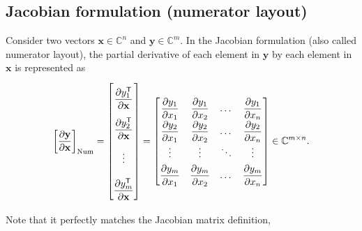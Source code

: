 \documentclass{article}
\newcommand{\trans}{\mathsf{T}}
\begin{document}
\subsection{Jacobian formulation (numerator layout)}

Consider two vectors \(\mathbf{x} \in \mathbb{C}^n\) and \(\mathbf{y} \in \mathbb{C}^m\). In the Jacobian formulation (also called numerator layout), the partial derivative of each element in \(\mathbf{y}\) by each element in \(\mathbf{x}\) is represented as
\begin{align}
    \label{eq:jacobian-formulation}
    \left[ \dfrac{\partial \mathbf{y}}{\partial \mathbf{x}} \right]_{\textnormal{Num}} = \renewcommand{\arraystretch}{2.6} \begin{bmatrix}
        \dfrac{\partial y_1^\trans}{\partial \mathbf{x}} \\
        \dfrac{\partial y_2^\trans}{\partial \mathbf{x}} \\ 
        \vdots \\ 
        \dfrac{\partial y_m^\trans}{\partial \mathbf{x}}
    \end{bmatrix} = \renewcommand{\arraystretch}{1.8}
    \begin{bmatrix}
        \dfrac{\partial y_1}{\partial x_1} & \dfrac{\partial y_1}{\partial x_2} & \dots & \dfrac{\partial y_1}{\partial x_n} \\
        \dfrac{\partial y_2}{\partial x_1} & \dfrac{\partial y_2}{\partial x_2} & \dots & \dfrac{\partial y_2}{\partial x_n} \\
        \vdots & \vdots & \ddots & \vdots \\
        \dfrac{\partial y_m}{\partial x_1} & \dfrac{\partial y_m}{\partial x_2} & \dots & \dfrac{\partial y_m}{\partial x_n} \\
    \end{bmatrix} \in \mathbb{C}^{m\times n}.
\end{align}

Note that it perfectly matches the Jacobian matrix definition,
\end{document}
